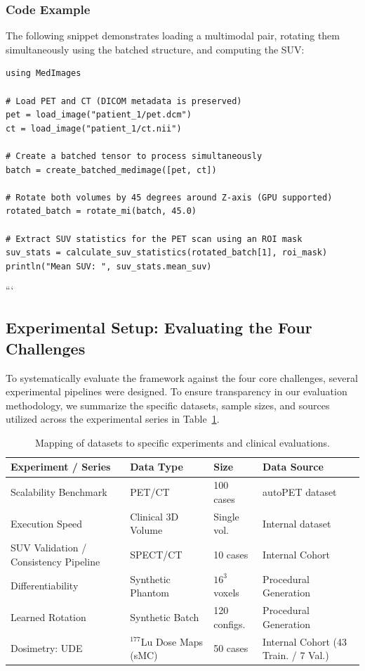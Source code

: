 \documentclass[a4paper,10pt,preprint]{elsarticle}
\begin{document}
\subsubsection*{Code Example}
The following snippet demonstrates loading a multimodal pair, rotating them simultaneously using the batched structure, and computing the SUV:

\begin{lstlisting}[basicstyle=\ttfamily\footnotesize]
using MedImages

# Load PET and CT (DICOM metadata is preserved)
pet = load_image("patient_1/pet.dcm")
ct = load_image("patient_1/ct.nii")

# Create a batched tensor to process simultaneously
batch = create_batched_medimage([pet, ct])

# Rotate both volumes by 45 degrees around Z-axis (GPU supported)
rotated_batch = rotate_mi(batch, 45.0)

# Extract SUV statistics for the PET scan using an ROI mask
suv_stats = calculate_suv_statistics(rotated_batch[1], roi_mask)
println("Mean SUV: ", suv_stats.mean_suv)
\end{lstlisting}

```
\subsection*{Experimental Setup: Evaluating the Four Challenges}
To systematically evaluate the framework against the four core challenges, several experimental pipelines were designed. To ensure transparency in our evaluation methodology, we summarize the specific datasets, sample sizes, and sources utilized across the experimental series in Table~\ref{tab:dataset_mapping}.

\begin{table}[H]
\centering
\caption{Mapping of datasets to specific experiments and clinical evaluations.}
\label{tab:dataset_mapping}
\renewcommand{\arraystretch}{1.2}
\begin{tabular}{|p{}|p{}|p{}|p{}|}
\hline
\textbf{Experiment / Series} & \textbf{Data Type} & \textbf{Size} & \textbf{Data Source} \\
\hline
Scalability Benchmark & PET/CT& 100 cases & autoPET dataset \cite{Dexl_2025} \\
\hline
Execution Speed & Clinical 3D Volume & Single vol. & Internal dataset\\
\hline
SUV Validation / Consistency Pipeline& SPECT/CT& 10 cases & Internal Cohort\\
\hline
Differentiability & Synthetic Phantom & $16^3$ voxels & Procedural Generation \\
\hline
Learned Rotation & Synthetic Batch & 120 configs. & Procedural Generation \\
\hline
Dosimetry: UDE & $^{177}\mathrm{Lu}$ Dose Maps (sMC)& 50 cases & Internal Cohort (43 Train. / 7 Val.)\\
\hline
\end{tabular}
\end{table}




\end{document}
